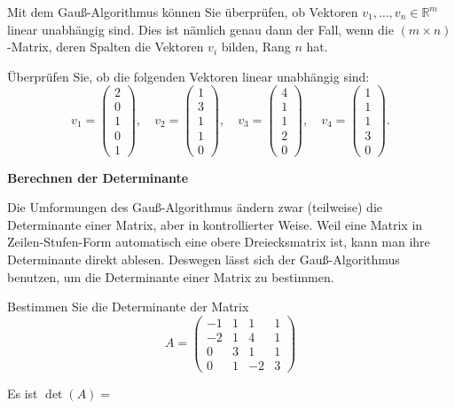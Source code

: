 \documentclass{ximera}
\begin{document}
Mit dem Gauß-Algorithmus können Sie überprüfen, ob Vektoren $v_1, \dots, v_n \in\mathbb R^m$ linear unabhängig sind. Dies ist nämlich genau dann der Fall, wenn die $(m\times n)$-Matrix, deren Spalten die Vektoren $v_i$ bilden, Rang $n$ hat.

\begin{question}
    Überprüfen Sie, ob die folgenden Vektoren linear unabhängig sind:
\[
v_1 = \left(
\begin{array}{c}
   2 \\ 0 \\ 1 \\ 0 \\ 1
\end{array}
\right), \quad
v_2 = \left(
\begin{array}{c}
   1 \\ 3 \\ 1 \\ 1 \\ 0
\end{array}
\right), \quad
v_3 = \left(
\begin{array}{c}
   4 \\ 1 \\ 1 \\ 2 \\ 0
\end{array}
\right), \quad
v_4 = \left(
\begin{array}{c}
   1 \\ 1 \\ 1 \\ 3 \\ 0
\end{array}
\right).
\]
\begin{solution}
\begin{multiple-choice}
\end{multiple-choice}
\end{solution}
\end{question}


\textbf{Berechnen der Determinante}

Die Umformungen des Gauß-Algorithmus ändern zwar (teilweise) die Determinante einer Matrix, aber in kontrollierter Weise. Weil eine Matrix in Zeilen-Stufen-Form automatisch eine obere Dreiecksmatrix ist, kann man ihre Determinante direkt ablesen. Deswegen lässt sich der Gauß-Algorithmus benutzen, um die Determinante einer Matrix zu bestimmen.

\begin{question}
    Bestimmen Sie die Determinante der Matrix
\[
A = \left(
\begin{array}{cccc}
 -1&1&1&1\\
 -2&1&4&1\\
 0&3&1&1 \\
 0&1&-2&3    
\end{array}
\right)
\]
\begin{solution}
Es ist $\det(A) =$ 
\end{solution}
\end{question}
\end{document}
